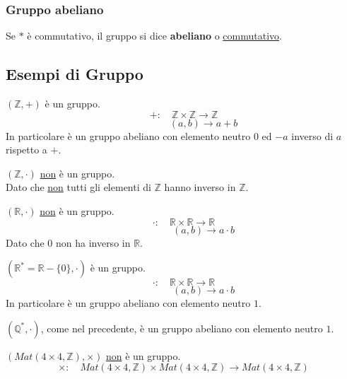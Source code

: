 \documentclass[a4paper,12pt, oneside]{book}
\begin{document}
			\subsubsection{Gruppo abeliano}
				\begin{definizione}
					Se $*$ è commutativo, il gruppo si dice \textbf{abeliano} o \underline{commutativo}.
				\end{definizione}
		
		\begin{shaded}
			\subsection{Esempi di Gruppo}
				\begin{esempio}
					$(\mathbb{Z}, +)$ è un gruppo.\\
					$$+: \quad \mathbb{Z} \times \mathbb{Z} \rightarrow \mathbb{Z}$$
					$$ \qquad \qquad (a,b) \rightarrow a+b$$
					In particolare è un gruppo abeliano con elemento neutro $0$ ed $-a$ inverso di $a$ rispetto a $+$.
				\end{esempio}
				\begin{esempio}
					$(\mathbb{Z}, \cdot)$ \underline{non} è un gruppo.\\
					Dato che \underline{non} tutti gli elementi di $\mathbb{Z}$ hanno inverso in $\mathbb{Z}$.
				\end{esempio}
				\begin{esempio}
					$(\mathbb{R}, \cdot)$ \underline{non} è un gruppo.\\
					$$\cdot: \quad \mathbb{R} \times \mathbb{R} \rightarrow \mathbb{R}$$
					$$ \qquad \qquad (a,b) \rightarrow a\cdot b$$
					Dato che $0$ non ha inverso in $\mathbb{R}$.
				\end{esempio}
				\begin{esempio}
					$(\mathbb{R}^{*} = \mathbb{R}-\{0\}, \cdot)$ è un gruppo.\\
					$$\cdot: \quad \mathbb{R} \times \mathbb{R} \rightarrow \mathbb{R}$$
					$$ \qquad \qquad (a,b) \rightarrow a\cdot b$$
					In particolare è un gruppo abeliano con elemento neutro $1$.
				\end{esempio}
				\begin{esempio}
					$(\mathbb{Q}^{*}, \cdot)$, come nel precedente, è un gruppo abeliano con elemento neutro $1$.
				\end{esempio}
				\begin{esempio}
					$(Mat(4 \times 4, \mathbb{Z}), \times)$ \underline{non} è un gruppo.
					$$\times: \quad Mat(4 \times 4, \mathbb{Z}) \times Mat(4 \times 4, \mathbb{Z}) \rightarrow Mat(4 \times 4, \mathbb{Z})$$

\end{esempio}
\end{shaded}
\end{document}
